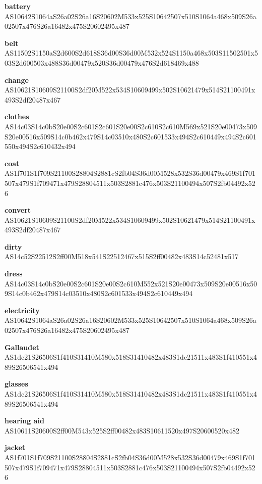 \documentclass{article}
\begin{document}
\begin{glossary}
\textbf{battery}\\
AS10642S1064aS26a02S26a16S20602M533x525S10642507x510S1064a468x509S26a02507x476S26a16482x475S20602495x487

\textbf{belt}\\
AS11502S1150aS2d600S2d618S36d00S36d00M532x524S1150a468x503S11502501x503S2d600503x488S36d00479x520S36d00479x476S2d618469x488

\textbf{change}\\
AS10621S10609S21100S2df20M522x534S10609499x502S10621479x514S21100491x493S2df20487x467

\textbf{clothes}\\
AS14c03S14c0bS20e00S2c601S2c601S20e00S2c610S2c610M569x521S20e00473x509S20e00516x509S14c0b462x479S14c03510x480S2c601533x494S2c610449x494S2c601550x494S2c610432x494

\textbf{coat}\\
AS1f701S1f709S21100S28804S2881cS2fb04S36d00M528x532S36d00479x469S1f701507x479S1f709471x479S28804511x503S2881c476x503S21100494x507S2fb04492x526

\textbf{convert}\\
AS10621S10609S21100S2df20M522x534S10609499x502S10621479x514S21100491x493S2df20487x467

\textbf{dirty}\\
AS14c52S22512S2ff00M518x541S22512467x515S2ff00482x483S14c52481x517

\textbf{dress}\\
AS14c03S14c0bS20e00S2c601S20e00S2c610M552x521S20e00473x509S20e00516x509S14c0b462x479S14c03510x480S2c601533x494S2c610449x494

\textbf{electricity}\\
AS10642S1064aS26a02S26a16S20602M533x525S10642507x510S1064a468x509S26a02507x476S26a16482x475S20602495x487

\textbf{Gallaudet}\\
AS1dc21S26506S1f410S31410M580x518S31410482x483S1dc21511x483S1f410551x489S26506541x494

\textbf{glasses}\\
AS1dc21S26506S1f410S31410M580x518S31410482x483S1dc21511x483S1f410551x489S26506541x494

\textbf{hearing aid}\\
AS10611S20600S2ff00M543x525S2ff00482x483S10611520x497S20600520x482

\textbf{jacket}\\
AS1f701S1f709S21100S28804S2881cS2fb04S36d00M528x532S36d00479x469S1f701507x479S1f709471x479S28804511x503S2881c476x503S21100494x507S2fb04492x526


\end{glossary}
\end{document}
